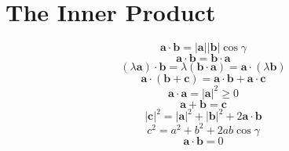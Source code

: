 \documentclass[11pt, a4paper, fleqn]{report}
\numberwithin{equation}{section}
\begin{document}
\section{The Inner Product}
\begin{equation}
    \mathbf{a}\cdot\mathbf{b}=|\mathbf{a}||\mathbf{b}|\cos\gamma
\end{equation}
\begin{equation}
    \mathbf{a}\cdot\mathbf{b}=\mathbf{b}\cdot\mathbf{a}
\end{equation}
\begin{equation}
    (\lambda\mathbf{a})\cdot\mathbf{b}=\lambda(\mathbf{b}\cdot\mathbf{a})=\mathbf{a}\cdot(\lambda\mathbf{b})
\end{equation}
\begin{equation}
    \mathbf{a}\cdot(\mathbf{b}+\mathbf{c})=\mathbf{a}\cdot\mathbf{b}+\mathbf{a}\cdot\mathbf{c}
\end{equation}
\begin{equation}
    \mathbf{a}\cdot\mathbf{a}=|\mathbf{a}|^2\geq 0
\end{equation}
\begin{equation}
    \mathbf{a}+\mathbf{b}=\mathbf{c}
\end{equation}
\begin{equation}
    |\mathbf{c}|^2=|\mathbf{a}|^2+|\mathbf{b}|^2+2\mathbf{a}\cdot\mathbf{b}
\end{equation}
\begin{equation}
    c^2=a^2+b^2+2ab\cos\gamma
\end{equation}
\begin{equation}
    \mathbf{a}\cdot\mathbf{b}=0
\end{equation}
\end{document}
